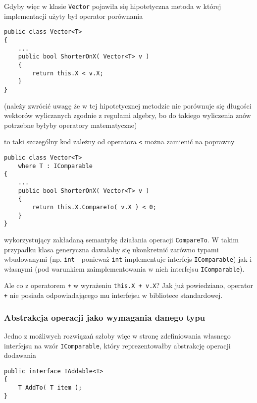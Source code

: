 Gdyby więc w klasie {\tt Vector} pojawiła się hipotetyczna metoda w której implementacji użyty był operator porównania

\begin{scriptsize}
\begin{verbatim}
public class Vector<T>
{
    ...
    public bool ShorterOnX( Vector<T> v )
    {
        return this.X < v.X;
    }    
}
\end{verbatim}
\end{scriptsize}

(należy zwrócić uwagę że w tej hipotetycznej metodzie nie porównuje się długości wektorów wyliczanych
zgodnie z regułami algebry, bo do takiego wyliczenia znów potrzebne byłyby operatory matematyczne)

to taki szczególny kod zależny od operatora {\tt <} można zamienić na poprawny

\begin{scriptsize}
\begin{verbatim}
public class Vector<T>
    where T : IComparable
{
    ...
    public bool ShorterOnX( Vector<T> v )
    {
        return this.X.CompareTo( v.X ) < 0;
    }    
}
\end{verbatim}
\end{scriptsize}

wykorzystujący zakładaną semantykę działania operacji {\tt CompareTo}. W takim przypadku klasa generyczna
dawałaby się ukonkretnić zarówno typami wbudowanymi (np. {\tt int} - ponieważ {\tt int} implementuje interfejs
{\tt IComparable}) jak i własnymi (pod warunkiem zaimplementowania w nich interfejsu {\tt IComparable}).

Ale co z operatorem {\tt +} w wyrażeniu {\tt this.X + v.X}? Jak już powiedziano, operator {\tt +} 
nie posiada odpowiadającego mu interfejsu w bibliotece standardowej.

\subsubsection{Abstrakcja operacji jako wymagania danego typu}

Jedno z możliwych rozwiązań szłoby więc w stronę zdefiniowania własnego interfejsu na wzór {\tt IComparable}, który
reprezentowałby abstrakcję operacji dodawania

\begin{scriptsize}
\begin{verbatim}
public interface IAddable<T>
{
    T AddTo( T item );
}
\end{verbatim}
\end{scriptsize}


